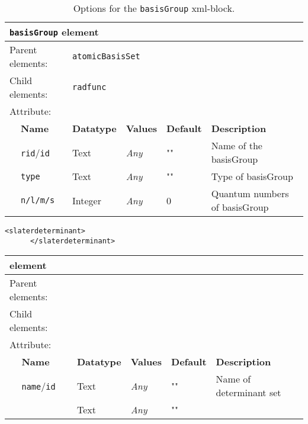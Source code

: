 \begin{table}[h]
\begin{center}
\begin{tabularx}{\textwidth}{l l l l l X }
\hline
\multicolumn{6}{l}{\texttt{basisGroup} element} \\
\hline
\multicolumn{2}{l}{Parent elements:} & \multicolumn{4}{l}{\texttt{atomicBasisSet}}\\
\multicolumn{2}{l}{Child  elements:} & \multicolumn{4}{l}{\texttt{radfunc}}\\
\multicolumn{2}{l}{Attribute:} & \multicolumn{4}{l}{}\\
   &   \bfseries Name              & \bfseries Datatype & \bfseries Values & \bfseries Default   & \bfseries Description \\
   &   \texttt{rid}/\texttt{id}   &  Text              &  \textit{Any}    &  ""                & Name of the basisGroup \\
   &   \texttt{type}                    &  Text            &  \textit{Any}    &  ""                & Type of basisGroup \\
   &   \texttt{n/l/m/s}                 &  Integer           &  \textit{Any}    &  0                & Quantum numbers of basisGroup \\
  \hline
\end{tabularx}
\end{center}
\caption{Options for the \texttt{basisGroup} xml-block.}
\label{table:basisGroup}
\end{table}

\begin{minipage}{\linewidth}
\begin{lstlisting}[style=QMCPXML,caption=Basic input block for \texttt{slaterdeterminant} with an atom-centered \texttt{sposet}.\label{listing:slaterdeterminant}]
      <slaterdeterminant>
      </slaterdeterminant>
\end{lstlisting}
\end{minipage}

\begin{table}[h]
\begin{center}
\begin{tabularx}{\textwidth}{l l l l l X }
\hline
\multicolumn{6}{l}{\texttt{} element} \\
\hline
\multicolumn{2}{l}{Parent elements:} & \multicolumn{4}{l}{\texttt{}}\\
\multicolumn{2}{l}{Child  elements:} & \multicolumn{4}{l}{\texttt{}}\\
\multicolumn{2}{l}{Attribute:} & \multicolumn{4}{l}{}\\
   &   \bfseries Name              & \bfseries Datatype & \bfseries Values & \bfseries Default   & \bfseries Description \\
   &   \texttt{name}/\texttt{id}   &  Text              &  \textit{Any}    &  ""                & Name of determinant set \\
   &   \texttt{}                    &  Text              &  \textit{Any}    &  ""                &  \\
  \hline
\end{tabularx}
\end{center}
\end{table}

